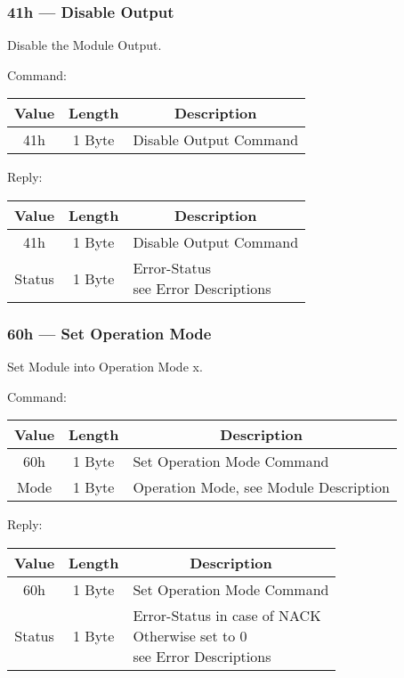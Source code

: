 \subsubsection{41h --- Disable Output}
Disable the Module Output.

Command:
\begin{table}[H]
    \centering
    \begin{tabular}{|c|c|l|}
        \hline
        \textbf{Value}   &   \textbf{Length} & \multicolumn{1}{|c|}{\textbf{Description}}\\ \hline \hline
        41h   &  1 Byte & Disable Output Command \\ \hline
    \end{tabular}
\label{tab:CAN-41-C}
\end{table}
Reply:
\begin{table}[H]
    \centering
    \begin{tabular}{|c|c|l|}
        \hline
        \textbf{Value}   &   \textbf{Length} & \multicolumn{1}{|c|}{\textbf{Description}}\\ \hline \hline
        41h   &  1 Byte & Disable Output Command \\ \hline
        Status & 1 Byte & \makecell[l]{Error-Status\\see Error Descriptions}\\ \hline
    \end{tabular}
\label{tab:CAN-41-R}
\end{table}
\subsubsection{60h --- Set Operation Mode}
Set Module into Operation Mode x. 

Command:
\begin{table}[H]
    \centering
    \begin{tabular}{|c|c|l|}
        \hline
        \textbf{Value}   &   \textbf{Length} & \multicolumn{1}{|c|}{\textbf{Description}}\\ \hline \hline
        60h   &  1 Byte & Set Operation Mode Command \\ \hline
        Mode & 1 Byte & Operation Mode, see Module Description\\ \hline
    \end{tabular}
\label{tab:CAN-60-C}
\end{table}
Reply:
\begin{table}[H]
    \centering
    \begin{tabular}{|c|c|l|}
        \hline
        \textbf{Value}   &   \textbf{Length} & \multicolumn{1}{|c|}{\textbf{Description}}\\ \hline \hline
        60h   &  1 Byte & Set Operation Mode Command \\ \hline
        Status & 1 Byte & \makecell[l]{Error-Status in case of NACK \\ Otherwise set to 0\\see Error Descriptions}\\ \hline
    \end{tabular}
\label{tab:CAN-60-R}
\end{table}

